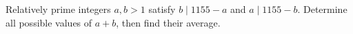 Relatively prime integers $a,b>1$ satisfy $b\mid1155-a$ and $a\mid1155-b$. Determine all possible values of $a+b$, then find their average.
